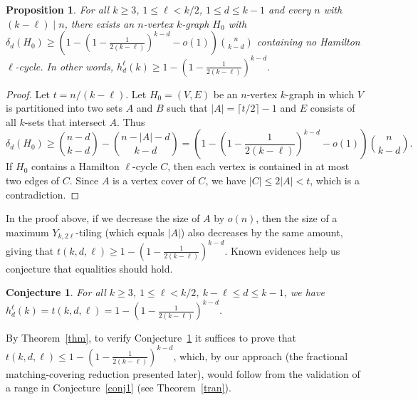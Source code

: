 \documentclass[11pt, reqno]{amsart}    	%
\newtheorem{conj}[thm]{Conjecture}
\newtheorem{prop}[thm]{Proposition}
\theoremstyle{definition}
\numberwithin{equation}{section}
\begin{document}
	\begin{prop} \label{pr}
		For all $k\ge3$, $1\leq \ell<k/2$, $ 1\leq d\le k-1 $ and every $ n$ with $(k-\ell)\mid n$, there exists an $n$-vertex $ k $-graph $H_0$ with $\delta_d(H_0)\ge(1-(1-\frac{1}{2(k-\ell)})^{k-d}-o(1)) \binom{n}{k-d}$ containing no Hamilton $\ell$-cycle. In other words, $h_{d}^{\ell}(k)\ge1-(1-\frac{1}{2(k-\ell)})^{k-d}$.
	\end{prop}
	
	\begin{proof}
		Let $ t=n/(k-\ell) $.
		Let $H_0=(V,E)$ be an $ n $-vertex $ k $-graph in which $ V $ is partitioned into two sets $ A $ and $ B $ such that $ |A|=\lceil t/2\rceil-1 $ and $ E $ consists of all $ k $-sets that intersect $ A $. Thus 
		\[\delta_d(H_0)\ge\binom{n-d}{k-d}-\binom{n-|A|-d}{k-d}=(1-(1-\frac{1}{2(k-\ell)})^{k-d}-o(1)) \binom{n}{k-d}.\] 
		If $H_0$ contains a Hamilton $\ell$-cycle $ C $, then each vertex is contained in at most two edges of $ C $. 
		Since $ A $ is a vertex cover of $ C $,  we have $ |C|\le 2|A|<t $, which is a contradiction.
	\end{proof}
	
	In the proof above, if we decrease the size of $A$ by $o(n)$, then the size of a maximum $Y_{k,2\ell}$-tiling (which equals $|A|$) also decreases by the same amount, giving that $t(k,d,\ell)\ge1-(1-\frac{1}{2(k-\ell)})^{k-d}$.
	Known evidences help us conjecture that equalities should hold.
	\begin{conj}\label{conj2} 
		For all $k\ge3$, $1\leq \ell<k/2$,  $k-\ell\le d \le k-1$, we have $h_{d}^{\ell}(k)= t(k,d,\ell)=1-(1-\frac{1}{2(k-\ell)})^{k-d}$.
	\end{conj}
	
	By Theorem~\ref{thm}, to verify Conjecture~\ref{conj2} it suffices to prove that $t(k,d,\ell)\le 1-(1-\frac{1}{2(k-\ell)})^{k-d}$, which, by our approach (the fractional matching-covering reduction presented later), would follow from the validation of a range in Conjecture~\ref{conj1} (see Theorem~\ref{tran}).
	
	
	
\end{document}
